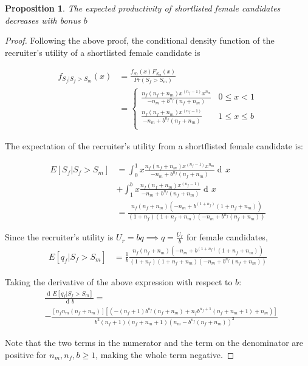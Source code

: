 \documentclass[11pt]{article}
\DeclareMathOperator{\di}{d\!}
\newtheorem{proposition}{Proposition}
\begin{document}
\begin{proposition}\label{prop_female_exp_qual}
    The expected productivity of shortlisted female candidates decreases with bonus $b$
\end{proposition}
\begin{proof}
    Following the above proof, the conditional density function of the recruiter's utility of a shortlisted female candidate is

    \begin{align*}
        f_{S_f|S_f>S_m}(x) & = \frac{f_{S_f}(x)F_{S_m}(x) }{Pr(S_f > S_m)} \\
                           & = \begin{cases}
            \frac{n_f(n_f+n_m)x^{(n_f-1)}x^{n_m}}{-n_m+b^{n_f}(n_f+n_m)} & 0 \leq x < 1    \\
            \frac{n_f(n_f+n_m)x^{(n_f-1)}}{-n_m+b^{n_f}(n_f+n_m)}        & 1 \leq x \leq b \\
        \end{cases}
    \end{align*}

    The expectation of the recruiter's utility from a shortflisted female candidate is:

    \begin{align*}
        E[S_f|S_f > S_m] & = \int_0^1{x \frac{ n_f(n_f+n_m)x^{(n_f-1)}x^{n_m}}{-n_m+b^{n_f}(n_f+n_m)} \di x}                 \\
                         & + \int_1^b{x \frac{n_f(n_f+n_m)x^{(n_f-1)}}{-n_m+b^{n_f}(n_f+n_m)} \di x}                         \\
                         & = \frac{n_f(n_f+n_m)(-n_m+b^{(1+n_f)} (1+n_f+n_m))}{(1+n_f) (1+n_f+n_m) (-n_m+b^{n_f} (n_f+n_m))}
    \end{align*}

    Since the recruiter's utility is $U_r = bq \implies q = \frac{U_r}{b}$ for female candidates,
    \begin{align*}
        E[q_f|S_f > S_m] & = \frac{1}{b} \frac{n_f(n_f+n_m)(-n_m+b^{(1+n_f)} (1+n_f+n_m))} {(1+n_f) (1+n_f+n_m) (-n_m+b^{n_f} (n_f+n_m))}
    \end{align*}

    Taking the derivative of the above expression with respect to $b$:
    \begin{align*}
         & \frac{\di E[q_f|S_f > S_m]} {\di b}  =                                                                                                                             \\
         & - \frac{[n_f n_m (n_f+n_m)] [\left(-(n_f+1) b^{n_f} (n_f+n_m)+n_f b^{n_f+1} (n_f+n_m+1)+n_m\right)]}{b^2 (n_f+1) (n_f+n_m+1) \left(n_m-b^{n_f} (n_f+n_m)\right)^2}
    \end{align*}

    Note that the two terms in the numerator and the term on the denominator are positive for $n_m, n_f, b \geq 1$, making the whole term negative.

\end{proof}
\end{document}
